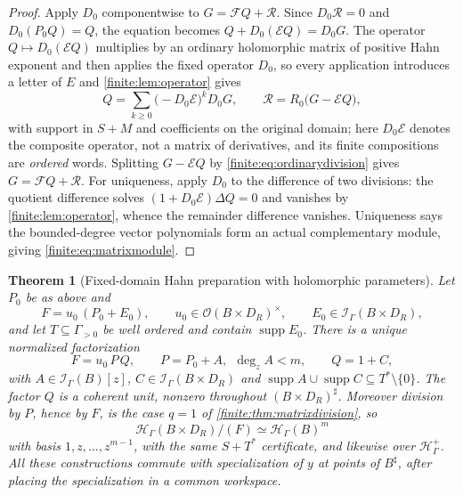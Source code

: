 \documentclass[11pt,letterpaper]{article}
\newtheorem{theorem}{Theorem}[section]
\theoremstyle{definition}
\theoremstyle{remark}
\newcommand{\OO}{\mathcal O}
\newcommand{\HH}{\mathscr H}
\newcommand{\Hp}{\mathscr H^{+}}
\newcommand{\Ip}{\mathscr I}
\newcommand{\sh}{^{\sharp}}
\DeclareMathOperator{\supp}{supp}
\numberwithin{equation}{section}
\begin{document}
\begin{proof}
Apply $D_0$ componentwise to $G=\mathcal FQ+\mathcal R$. Since $D_0\mathcal R=0$ and $D_0(P_0Q)=Q$, the equation becomes $Q+D_0(\mathcal EQ)=D_0G$. The operator $Q\mapsto D_0(\mathcal EQ)$ multiplies by an ordinary holomorphic matrix of positive Hahn exponent and then applies the fixed operator $D_0$, so every application introduces a letter of $E$ and \cref{finite:lem:operator} gives
\begin{equation}\label{finite:eq:matrixQ}
 Q=\sum_{k\geq0}\bigl(-D_0\mathcal E\bigr)^kD_0G,
 \qquad
 \mathcal R=R_0\bigl(G-\mathcal EQ\bigr),
\end{equation}
with support in $S+M$ and coefficients on the original domain; here $D_0\mathcal E$ denotes the composite operator, not a matrix of derivatives, and its finite compositions are \emph{ordered} words. Splitting $G-\mathcal EQ$ by \eqref{finite:eq:ordinarydivision} gives $G=\mathcal FQ+\mathcal R$. For uniqueness, apply $D_0$ to the difference of two divisions: the quotient difference solves $(1+D_0\mathcal E)\Delta Q=0$ and vanishes by \cref{finite:lem:operator}, whence the remainder difference vanishes. Uniqueness says the bounded-degree vector polynomials form an actual complementary module, giving \eqref{finite:eq:matrixmodule}.
\end{proof}

\begin{theorem}[Fixed-domain Hahn preparation with holomorphic parameters]
\label{finite:thm:parameterprep}
Let $P_0$ be as above and
\[
 F=u_0\,(P_0+E_0),
 \qquad u_0\in\OO(B\times D_R)^\times,
 \qquad E_0\in\Ip_\Gamma(B\times D_R),
\]
and let $T\subseteq\Gamma_{>0}$ be well ordered and contain $\supp E_0$. There is a \emph{unique} normalized factorization
\begin{equation}\label{finite:eq:parameterprep}
 F=u_0\,P\,Q,
 \qquad P=P_0+A,\ \ \deg_zA<m,
 \qquad Q=1+C,
\end{equation}
with $A\in\Ip_\Gamma(B)[z]$, $C\in\Ip_\Gamma(B\times D_R)$ and $\supp A\cup\supp C\subseteq T^*\setminus\{0\}$. The factor $Q$ is a coherent unit, nonzero throughout $(B\times D_R)\sh$. Moreover division by $P$, hence by $F$, is the case $q=1$ of \cref{finite:thm:matrixdivision}, so
\[
 \HH_\Gamma(B\times D_R)/(F)\simeq\HH_\Gamma(B)^m
\]
with basis $1,z,\ldots,z^{m-1}$, with the same $S+T^*$ certificate, and likewise over $\Hp_\Gamma$. All these constructions commute with specialization of $y$ at points of $B\sh$, after placing the specialization in a common workspace.
\end{theorem}
\end{document}
